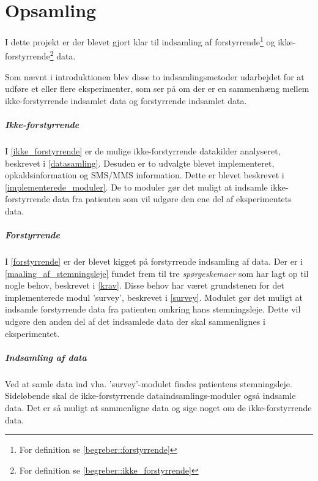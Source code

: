 \chapter{Opsamling}
I dette projekt er der blevet gjort klar til indsamling af forstyrrende\footnote{For definition se \cref{begreber::forstyrrende}} og ikke-forstyrrende\footnote{For definition se \cref{begreber::ikke_forstyrrende}} data. 

Som nævnt i introduktionen blev disse to indsamlingsmetoder udarbejdet for at udføre et eller flere eksperimenter, som ser på om der er en sammenhæng mellem ikke-forstyrrende indsamlet data og forstyrrende indsamlet data.

\paragraph{Ikke-forstyrrende}
I \cref{ikke_forstyrrende} er de mulige ikke-forstyrrende datakilder analyseret, beskrevet i \cref{datasamling}.
Desuden er to udvalgte blevet implementeret, opkaldsinformation og SMS/MMS information.
Dette er blevet beskrevet i \cref{implementerede_moduler}.
De to moduler gør det muligt at indsamle ikke-forstyrrende data fra patienten som vil udgøre den ene del af eksperimentets data.

\paragraph{Forstyrrende}
I \cref{forstyrrende} er der blevet kigget på forstyrrende indsamling af data.
Der er i \cref{maaling_af_stemningsleje} fundet frem til tre \textit{spørgeskemaer} som har lagt op til nogle behov, beskrevet i \cref{krav}.
Disse behov har været grundstenen for det implementerede modul 'survey', beskrevet i \cref{survey}.
Modulet gør det muligt at indsamle forstyrrende data fra patienten omkring hans stemningsleje.
Dette vil udgøre den anden del af det indsamlede data der skal sammenlignes i eksperimentet.

\paragraph{Indsamling af data}
Ved at samle data ind vha. 'survey'-modulet findes patientens stemningsleje.
Sideløbende skal de ikke-forstyrrende dataindsamlings-moduler også indsamle data.
Det er så muligt at sammenligne data og sige noget om de ikke-forstyrrende data.

